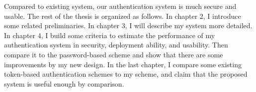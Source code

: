 \begin{CJK}{Bg5}{bsmi}
Compared to existing system, our authentication system is much secure and usable. The rest of the thesis is organized as follows. In chapter 2, I introduce some related preliminaries. In chapter 3, I will describe my system more detailed. In chapter 4, I build some criteria to estimate the performance of my authentication system in security, deployment ability, and usability. Then compare it to the password-based scheme and show that there are some improvements by my new design. In the last chapter, I compare some existing token-based authentication schemes to my scheme, and claim that the proposed system is useful enough by comparison.

\end{CJK}
